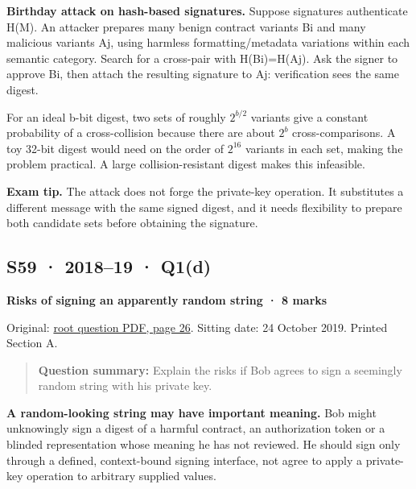 \documentclass[11pt,a4paper]{article}
\begin{document}
\textbf{Birthday attack on hash-based signatures.} Suppose signatures authenticate H(M). An attacker prepares many benign contract variants Bi and many malicious variants Aj,\allowbreak{} using harmless formatting/\allowbreak{}metadata variations within each semantic category. Search for a cross-pair with H(Bi)=\allowbreak{}H(Aj). Ask the signer to approve Bi,\allowbreak{} then attach the resulting signature to Aj: verification sees the same digest.


For an ideal b-bit digest,\allowbreak{} two sets of roughly \(2^{b/2}\) variants give a constant probability of a cross-collision because there are about \(2^{b}\) cross-comparisons. A toy 32-bit digest would need on the order of \(2^{16}\) variants in each set,\allowbreak{} making the problem practical. A large collision-resistant digest makes this infeasible.



{\color{ForestGreen}\textbf{Exam tip.} The attack does not forge the private-key operation. It substitutes a different message with the same signed digest,\allowbreak{} and it needs flexibility to prepare both candidate sets before obtaining the signature.}




\clearpage
\subsection{S59 · 2018–19 · Q1(d)}\label{s59}

\textbf{Risks of signing an apparently random string · 8 marks}


Original: \href{../../CSE405-Security_Merged.pdf\#page=26}{root question PDF,\allowbreak{} page 26}. Sitting date: 24 October 2019. Printed Section A.



\begin{quote}\small

\textbf{Question summary:} Explain the risks if Bob agrees to sign a seemingly random string with his private key.



\end{quote}

\textbf{A random-looking string may have important meaning.} Bob might unknowingly sign a digest of a harmful contract,\allowbreak{} an authorization token or a blinded representation whose meaning he has not reviewed. He should sign only through a defined,\allowbreak{} context-bound signing interface,\allowbreak{} not agree to apply a private-key operation to arbitrary supplied values.
\end{document}
